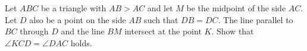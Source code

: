 Let $ABC$ be a triangle with $AB > AC$ and let $M$ be the midpoint of the side $AC$.
Let $D$ also be a point on the side $AB$ such that $DB = DC$.
The line parallel to $BC$ through $D$ and the line $BM$ intersect at the point $K$.
Show that $\angle KCD = \angle DAC$ holds.